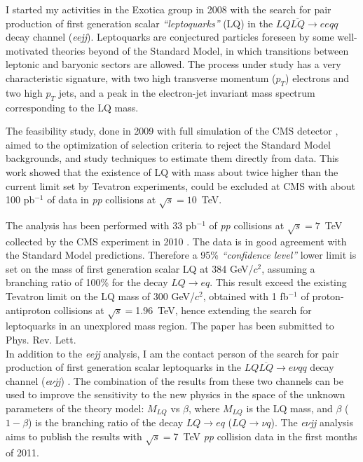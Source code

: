 \documentclass[10pt, a4paper]{article}
\begin{document}
I started my activities in the Exotica group in 2008 with the search for pair production of  first generation scalar {\it ``leptoquarks''} (LQ) 
in the $LQ\overline{LQ} \rightarrow ee qq$ decay channel ({\it eejj}). Leptoquarks are conjectured particles
foreseen by some well-motivated theories beyond of the Standard Model, in which transitions between 
leptonic and baryonic sectors are allowed. The process under study has a very characteristic signature, 
with two high transverse momentum ($p_T$) electrons and two high $p_T$ jets, and a peak in 
the electron-jet invariant mass spectrum corresponding to the LQ mass.

The feasibility study, done in 2009 with full simulation of the CMS detector \cite{EXO-08-010,AN-2008-070},
aimed to the optimization of selection criteria to reject the Standard Model backgrounds, and study
techniques to estimate them directly from data. This work showed that the existence of LQ with mass
about twice higher than the current limit set by Tevatron experiments, could be excluded at CMS with about 
100 pb$^{-1}$ of data in {\it pp} collisions at $\sqrt{s}=10$~TeV. 

The analysis has been performed with 33 pb$^{-1}$ of {\it pp} collisions at $\sqrt{s}=7$~TeV collected by the CMS experiment in 2010 
\cite{Khachatryan:2010mp,EXO-10-005,AN-2010-230}. The data is in good agreement with the Standard Model predictions. Therefore 
a 95\% {\it ``confidence level''} lower limit is set on the mass of first generation scalar LQ at 384 GeV/$c^2$, assuming a 
branching ratio of 100\% for the decay $LQ\rightarrow eq$. This result exceed the existing Tevatron limit on the LQ mass 
of 300 GeV/$c^2$, obtained with 1 fb$^{-1}$ of proton-antiproton collisions at $\sqrt{s}=$1.96~TeV, hence extending the search for 
leptoquarks in an unexplored mass region. The paper has been submitted to Phys. Rev. Lett. \\

In addition to the {\it eejj} analysis, I am the contact person of the search for pair production of first generation scalar leptoquarks
in the $LQ\overline{LQ} \rightarrow e\nu qq$ decay channel ({\it e$\nu$jj}) \cite{AN-2010-361}.
The combination of the results from these two channels can be used to improve the sensitivity to the new physics in 
the space of the unknown parameters of the theory model: $M_{LQ}$ vs $\beta$, where $M_{LQ}$ is the LQ mass, and 
$\beta$ ($1-\beta$) is the branching ratio of the decay $LQ\rightarrow eq$ ($LQ\rightarrow \nu q$). 
The {\it e$\nu$jj} analysis aims to publish the results with $\sqrt{s}=$7~TeV {\it pp} collision data in the first months of 2011.\\
\end{document}
